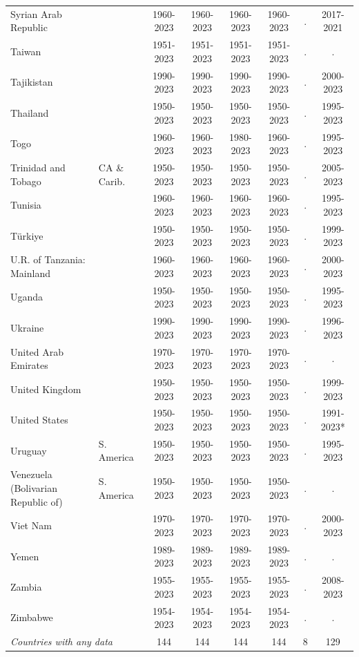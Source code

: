 \begin{longtable}{ll*{6}{c}}
Syrian Arab Republic &  & 1960-2023 & 1960-2023 & 1960-2023 & 1960-2023 & . & 2017-2021 \\
Taiwan &  & 1951-2023 & 1951-2023 & 1951-2023 & 1951-2023 & . & . \\
Tajikistan &  & 1990-2023 & 1990-2023 & 1990-2023 & 1990-2023 & . & 2000-2023 \\
Thailand &  & 1950-2023 & 1950-2023 & 1950-2023 & 1950-2023 & . & 1995-2023 \\
Togo &  & 1960-2023 & 1960-2023 & 1980-2023 & 1960-2023 & . & 1995-2023 \\
Trinidad and Tobago & CA \& Carib. & 1950-2023 & 1950-2023 & 1950-2023 & 1950-2023 & . & 2005-2023 \\
Tunisia &  & 1960-2023 & 1960-2023 & 1960-2023 & 1960-2023 & . & 1995-2023 \\
Türkiye &  & 1950-2023 & 1950-2023 & 1950-2023 & 1950-2023 & . & 1999-2023 \\
U.R. of Tanzania: Mainland &  & 1960-2023 & 1960-2023 & 1960-2023 & 1960-2023 & . & 2000-2023 \\
Uganda &  & 1950-2023 & 1950-2023 & 1950-2023 & 1950-2023 & . & 1995-2023 \\
Ukraine &  & 1990-2023 & 1990-2023 & 1990-2023 & 1990-2023 & . & 1996-2023 \\
United Arab Emirates &  & 1970-2023 & 1970-2023 & 1970-2023 & 1970-2023 & . & . \\
United Kingdom &  & 1950-2023 & 1950-2023 & 1950-2023 & 1950-2023 & . & 1999-2023 \\
United States &  & 1950-2023 & 1950-2023 & 1950-2023 & 1950-2023 & . & 1991-2023* \\
Uruguay & S. America & 1950-2023 & 1950-2023 & 1950-2023 & 1950-2023 & . & 1995-2023 \\
Venezuela (Bolivarian Republic of) & S. America & 1950-2023 & 1950-2023 & 1950-2023 & 1950-2023 & . & . \\
Viet Nam &  & 1970-2023 & 1970-2023 & 1970-2023 & 1970-2023 & . & 2000-2023 \\
Yemen &  & 1989-2023 & 1989-2023 & 1989-2023 & 1989-2023 & . & . \\
Zambia &  & 1955-2023 & 1955-2023 & 1955-2023 & 1955-2023 & . & 2008-2023 \\
Zimbabwe &  & 1954-2023 & 1954-2023 & 1954-2023 & 1954-2023 & . & . \\
\midrule
\multicolumn{2}{l}{\itshape Countries with any data} & 144 & 144 & 144 & 144 & 8 & 129 \\
\end{longtable}

